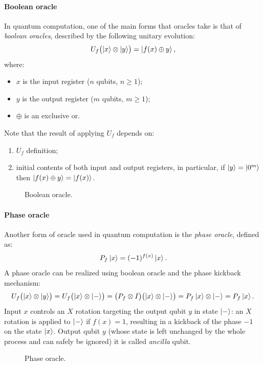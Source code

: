 \documentclass{article}
\begin{document}
\paragraph{Boolean oracle}
In quantum computation, one of the main forms that oracles take is that of
\emph{boolean oracles}, described by the following unitary evolution:
\[
  U_f \bigl( \ket{x} \otimes \ket{y} \bigr) =  \ket{f(x) \oplus y},
\]
where:
\begin{itemize}
  \item
  $x$ is the input register ($n$ qubits, $n \geq 1$);
  \item
  $y$ is the output register ($m$ qubits, $m \geq 1$);
  \item
  $\oplus$ is an exclusive or.
\end{itemize}
Note that the result of applying $U_f$ depends on:
\begin{enumerate}
  \item
  $U_f$ definition;
  \item
  initial contents of both input and output registers, in particular,
  if $\ket{y} = \ket{0^m}$ then $\ket{f(x) \oplus y} = \ket{f(x)}$.
\end{enumerate}
\begin{figure}[H]
  \centering
  
  \caption{Boolean oracle.}
\end{figure}

\paragraph{Phase oracle}
Another form of oracle used in quantum computation is the \emph{phase oracle},
defined as:
\[
  P_f \ket{x} = (-1)^{f(x)} \ket{x}.
\]
A phase oracle can be realized using boolean oracle and the phase kickback
mechanism:
\[
  U_f \bigl( \ket{x} \otimes \ket{y} \bigr)
  = U_f \bigl( \ket{x} \otimes \ket{-} \bigr)
  = \bigl( P_f \otimes  I \bigr) \bigl( \ket{x} \otimes \ket{-} \bigr)
  = P_f \ket{x} \otimes \ket{-}
  = P_f \ket{x}.
\]
Input $x$ controls an $X$ rotation targeting the output qubit $y$ in state
$\ket{-}$:
an $X$ rotation is applied to $\ket{-}$ if $f(x) = 1$, resulting in a kickback
of the phase $-1$ on the state $\ket{x}$.
Output qubit $y$ (whose state is left unchanged by the whole
process and can safely be ignored) it is called \emph{ancilla} qubit.
\begin{figure}[H]
  \centering
  
  \caption{Phase oracle.}
\end{figure}
\end{document}
